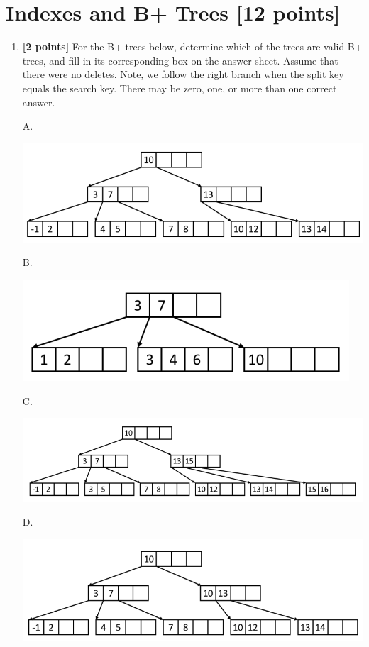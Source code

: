 \documentclass[10pt]{article}
\begin{document}
\section{Indexes and B+ Trees \textbf{[12 points]}}
\begin{enumerate}

	\item \textbf{[2 points]}
	      For the B+ trees below, determine which of the trees are valid B+ trees, and fill in its corresponding box on the answer sheet.
	      Assume that there were no deletes. Note, we follow the right branch when the split key equals the search key.
	      There may be zero, one, or more than one correct answer.

	      A.

	      \includegraphics[scale=0.4]{3.png}

	      B.

	      \includegraphics[scale=0.4]{1.png}

	      C.

	      \includegraphics[scale=0.4]{4.png}

	      D.

	      \includegraphics[scale=0.4]{2.png}
	      \\


\end{enumerate}
\end{document}
